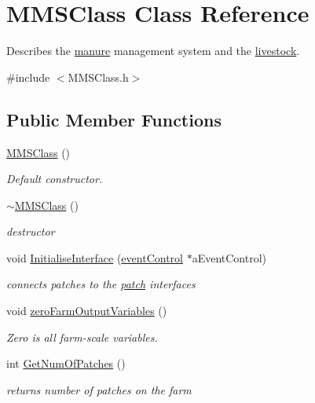 \hypertarget{class_m_m_s_class}{
\section{MMSClass Class Reference}
\label{class_m_m_s_class}
}


Describes the \hyperlink{classmanure}{manure} management system and the \hyperlink{classlivestock}{livestock}.  


{\ttfamily \#include $<$MMSClass.h$>$}\subsection*{Public Member Functions}
\begin{DoxyCompactItemize}
\item 
\hyperlink{class_m_m_s_class_a0fc546f250eed8b990109b05c7241140}{MMSClass} ()
\begin{DoxyCompactList}\small\item\em Default constructor. \item\end{DoxyCompactList}\item 
\hyperlink{class_m_m_s_class_ae35ad04eea43313d0742a23bdafa6914}{$\sim$MMSClass} ()
\begin{DoxyCompactList}\small\item\em destructor \item\end{DoxyCompactList}\item 
void \hyperlink{class_m_m_s_class_acdbfef61f2562067975629532d0da4bf}{InitialiseInterface} (\hyperlink{classevent_control}{eventControl} $\ast$aEventControl)
\begin{DoxyCompactList}\small\item\em connects patches to the \hyperlink{classpatch}{patch} interfaces \item\end{DoxyCompactList}\item 
void \hyperlink{class_m_m_s_class_a4e86f78741f81b1fd9532da0cf77748c}{zeroFarmOutputVariables} ()
\begin{DoxyCompactList}\small\item\em Zero is all farm-\/scale variables. \item\end{DoxyCompactList}\item 
int \hyperlink{class_m_m_s_class_a5fbe8cd0e5e37a2770694c63ce042da3}{GetNumOfPatches} ()
\begin{DoxyCompactList}\small\item\em returns number of patches on the farm \item\end{DoxyCompactList}\item 

\end{DoxyCompactItemize}
